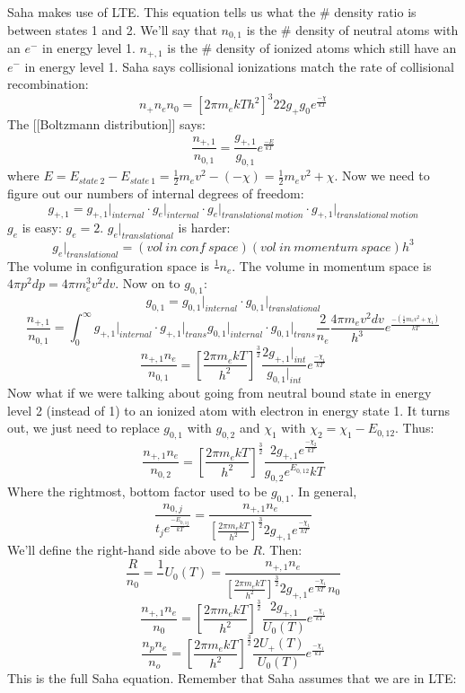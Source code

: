 \documentclass{article}
\def\inv#1{\frac1{#1}}
\def\hf{\frac12}
\def\eval#1{\big|_{#1}}
\def\inv#1{{\frac{1}{}#1}}
\def\eval#1{\big|_{#1}}
\def\hf{\frac12}
\begin{document}
Saha makes use of LTE.  This equation tells us what the \# density ratio is
between states 1 and 2.  We'll say that $n_{0,1}$ is the \# density of neutral
atoms with an $e^-$ in energy level 1.  $n_{+,1}$ is the \# density of ionized
atoms which still have an $e^-$ in energy level 1.  Saha says
collisional ionizations match the rate of collisional recombination:
$${n_+n_e}{ n_0}=\left[{2\pi m_ekT}{ h^2}\right]^{3}{2}{2g_+}{
g_0}e^\frac{-\chi}{ kT}$$
The [[Boltzmann distribution]] says:
\def\npo{n_{+,1}}
\def\noo{n_{0,1}}
\def\gpo{g_{+,1}}
\def\goo{g_{0,1}}
$$\frac{\npo}{\noo}=\frac{\gpo}{\goo}e^\frac{-E}{ kT}$$
where $E=E_{state\ 2}-E_{state\ 1}=\hf m_ev^2-(-\chi)=\hf m_ev^2+\chi$.  Now
we need to figure out our numbers of internal degrees of freedom:
$$\gpo =\gpo\eval{internal}\cdot g_e\eval{internal}\cdot 
g_e\eval{translational\ motion}\cdot \gpo\eval{translational\ motion}$$
$g_e$ is easy: $g_e=2$.  $g_e\eval{translational}$ is harder:
$$g_e\eval{translational} = {(vol\ in\ conf\ space)(vol\ in\ momentum\ space)
}{ h^3}$$
The volume in configuration space is $\inv{n_e}$.  The volume in momentum
space is $4\pi p^2dp=4\pi m_e^3v^2dv$. Now on to $\goo$:
$$\goo=\goo\eval{internal}\cdot\goo\eval{translational}$$
$$\frac{\npo}{\noo}=\int_0^\infty{\gpo\eval{internal}\cdot\gpo\eval{trans}
}{\goo\eval{internal}\cdot\goo\eval{trans}}\frac{2}{ n_e}
\frac{4\pi m_ev^2dv}{ h^3}e^\frac{-(\hf m_ev^2+\chi_1)}{ kT}$$
$$\frac{\npo n_e}{ \noo}=\left[\frac{2\pi m_ekT}{ h^2}\right]^\frac{3}{2}
\frac{2\gpo\eval{int}}{\goo\eval{int}}e^\frac{-\chi_1}{ kT}$$
Now what if we were talking about going from neutral bound state in energy
level 2 (instead of 1) to an ionized atom with electron in energy state 1.
It turns out, we just need to replace $\goo$ with $g_{0,2}$ and
\def\got{g_{0,2}}
\def\nzt{n_{0,2}}
$\chi_1$ with $\chi_2=\chi_1-E_{0,12}$.  Thus:
$$\frac{\npo n_e}{\nzt}=\left[\frac{2\pi m_ekT}{ h^2}\right]^\frac{3}{2}\frac{2\gpo
e^\frac{-\chi_2}{ kT}}{\got e^{E_{0,12}}{ kT}}$$
\def\tpmekth{\left[\frac{2\pi m_ekT}{ h^2}\right]^\frac{3}{2}}
Where the rightmost, bottom factor used to be $\goo$.  In general,
$$\frac{n_{0,j}}{ t_je^\frac{-E_{0,1j}}{ kT}}=\frac{\npo n_e}{\tpmekth 2\gpo
e^\frac{-\chi_1}{ kT}}$$
We'll define the right-hand side above to be $R$.  Then:
$$\frac{R}{ n_0}=\inv{U_0(T)}=\frac{\npo n_e}{\tpmekth 2\gpo
e^\frac{-\chi_1}{ kT}n_0}$$
$$\frac{\npo n_e}{ n_0}=\tpmekth\frac{2\gpo}{ U_0(T)}
e^\frac{-\chi_1}{ kT}$$
$$\boxed{\frac{n_pn_e}{ n_o}=\tpmekth\frac{2U_+(T)}{ U_0(T)}
e^\frac{-\chi_1}{ kT}}$$
This is the full Saha equation.  Remember that Saha assumes that we are in LTE:
\end{document}
